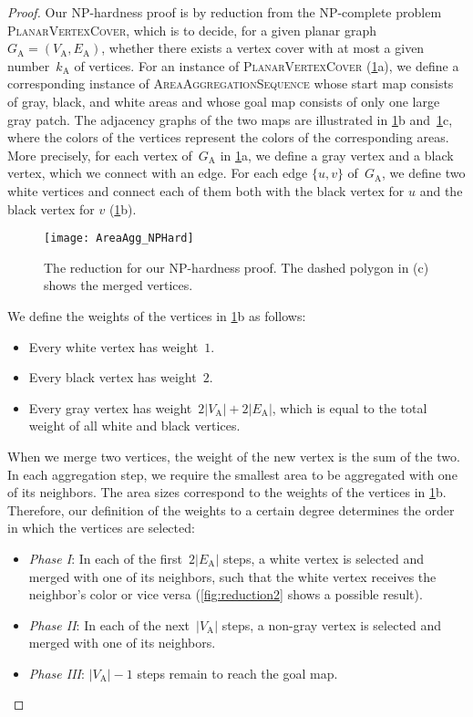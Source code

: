 \documentclass[acmsmall,natbib=false]{acmart}
\begin{document}
\begin{proof}
Our NP-hardness proof is by reduction from 
the NP-complete problem \textsc{PlanarVertexCover}, 
which is to decide, for a given 
planar graph~$G_\mathrm{A} = (V_\mathrm{A},E_\mathrm{A})$, 
whether there exists a vertex cover 
with at most a given number~$k_\mathrm{A}$ of vertices. 
For an instance of \textsc{PlanarVertexCover}
(\fig\ref{fig:AreaAgg_Reduction}a), 
we define a corresponding instance of \textsc{AreaAggregationSequence}
whose start map consists of gray, black, and white areas and 
whose goal map consists of only one large gray patch.
The adjacency graphs of the two maps are illustrated 
in \figs\ref{fig:AreaAgg_Reduction}b and~\ref{fig:AreaAgg_Reduction}c, 
where the colors of the vertices represent 
the colors of the corresponding areas.
More precisely, for each vertex of~$G_\mathrm{A}$
in \fig\ref{fig:AreaAgg_Reduction}a, 
we define a gray vertex and a black vertex, 
which we connect with an edge. 
For each edge $\{u,v\}$ of~$G_\mathrm{A}$, 
we define two white vertices and 
connect each of them both with the black vertex for $u$
and the black vertex for $v$
(\fig\ref{fig:AreaAgg_Reduction}b).

\begin{figure}[tb]
\centering
\texttt{[image: AreaAgg\_NPHard]}
\caption{The reduction for our NP-hardness proof.
    The dashed polygon in (c) shows 
    the merged vertices.}
\label{fig:AreaAgg_Reduction}
\end{figure}

We define the weights of the vertices 
in \fig\ref{fig:AreaAgg_Reduction}b as follows:
\begin{itemize}
\item Every white vertex has weight~$1$.
\item Every black vertex has weight~$2$.
\item Every gray vertex has weight~$2|V_\mathrm{A}| + 2|E_\mathrm{A}|$,
which is equal to the total weight of all white and black vertices.
\end{itemize}
When we merge two vertices, 
the weight of the new vertex is the sum of the two.
In each aggregation step, 
we require the smallest area to be aggregated with one of its neighbors.
The area sizes correspond to the weights of the vertices in \fig\ref{fig:AreaAgg_Reduction}b.   
Therefore, our definition of the weights to a certain degree determines 
the order in which the vertices are selected:
\begin{itemize}
\item \emph{Phase I}: In each of the first~$2|E_\mathrm{A}|$ steps, 
a white vertex is selected and merged with one of its neighbors, 
such that the white vertex receives the neighbor's color or vice versa
(\fig\ref{fig:reduction2} shows a possible result).
\item \emph{Phase II}: In each of the next~$|V_\mathrm{A}|$ steps, 
a non-gray vertex is selected and merged with one of its neighbors.
\item \emph{Phase III}: $|V_\mathrm{A}|-1$ steps remain to reach the goal map.
\end{itemize}


\end{proof}
\end{document}

